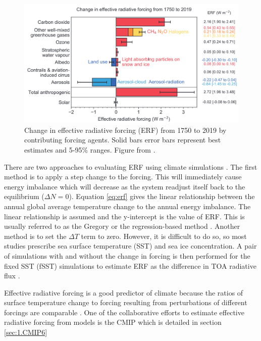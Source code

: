 \begin{figure}
    \centering
    \includegraphics[width=6in]{Chapter1/figs/02_ERF.png}
    \caption[Effective radiative forcing (ERF) from 1750 to 2019]{Change in effective radiative forcing (ERF) from 1750 to 2019 by contributing forcing agents. Solid bars error bars represent best estimates and 5-95\% ranges. Figure from \citet{forsterEarthEnergyBudget2021}.}
    \label{fig:1.ERF}
\end{figure}

There are two approaches to evaluating ERF using climate simulations \citep[e.g.][]{gregoryNewMethodDiagnosing2004, oconnorAssessmentPreindustrialPresentday2021}.  The first method is to apply a step change to the forcing. This will immediately cause energy imbalance which will decrease as the system readjust itself back to the equilibrium ($\Delta N=0$). Equation \ref{eq:erf} gives the linear relationship between the annual global average temperature change to the annual energy imbalance. The linear relationship is assumed and the y-intercept is the value of ERF. This is usually referred to as the Gregory or the regression-based method \citep{gregoryNewMethodDiagnosing2004}. Another method is to set the $\Delta T$ term to zero. However, it is difficult to do so, so most studies prescribe sea surface temperature (SST) and sea ice concentration. A pair of simulations with and without the change in forcing is then performed for the fixed SST (fSST) simulations to estimate ERF as the difference in TOA radiative flux \citep{myhreNewEstimatesRadiative1998}. 


Effective radiative forcing is a good predictor of climate because the ratios of surface temperature change to forcing resulting from perturbations of different forcings are comparable \citep{myhreAnthropogenicNaturalRadiative2013, boucherCloudsAerosols2014}. One of the collaborative efforts to estimate effective radiative forcing from models is the CMIP which is detailed in section \ref{sec:1.CMIP6}


